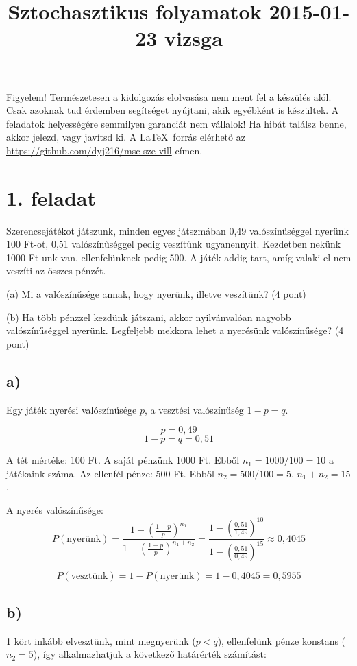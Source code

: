 \documentclass[a4paper,12pt]{article}   		%
\title{Sztochasztikus folyamatok 2015-01-23 vizsga}
\begin{document}
\maketitle

Figyelem! Természetesen a kidolgozás elolvasása nem ment fel a készülés
alól. Csak azoknak tud érdemben segítséget nyújtani, akik egyébként is
készültek. A feladatok helyességére semmilyen garanciát nem vállalok!
Ha hibát találsz benne, akkor jelezd, vagy javítsd ki. A \LaTeX\ forrás
elérhető az \url{https://github.com/dyj216/msc-sze-vill} címen.

\section*{1. feladat}
Szerencsejátékot játszunk, minden egyes játszmában 0,49 valószínűséggel
nyerünk 100 Ft-ot, 0,51 valószínűséggel pedig veszítünk ugyanennyit. 
Kezdetben nekünk 1000 Ft-unk van, ellenfelünknek pedig 500. A játék
addig tart, amíg valaki el nem veszíti az összes pénzét.

(a) Mi a valószínűsége annak, hogy nyerünk, illetve veszítünk? (4 pont)

(b) Ha több pénzzel kezdünk játszani, akkor nyilvánvalóan nagyobb 
valószínűséggel nyerünk. Legfeljebb mekkora lehet a nyerésünk
valószínűsége? (4 pont)
\subsection*{a)}
Egy játék nyerési valószínűsége $p$, a vesztési valószínűség $1-p=q$.

\[p = 0,49\]
\[1-p = q = 0,51\]

A tét mértéke: 100 Ft. A saját pénzünk 1000 Ft. Ebből $n_1 = 1000/100=10$ a 
játékaink száma. Az ellenfél pénze: 500 Ft. Ebből $n_2 = 500/100=5$.
$n_1 + n_2 = 15$.

A nyerés valószínűsége:
\[P(\text{nyerünk}) = \frac{1-\left(\frac{1-p}{p}\right)^{n_1}}
{1-\left(\frac{1-p}{p}\right)^{n_1+n_2}} = 
\frac{1-\left(\frac{0,51}{1,49}\right)^{10}}
{1-\left(\frac{0,51}{0,49}\right)^{15}} \approx 0,4045 \]

\[P(\text{vesztünk}) = 1 - P(\text{nyerünk}) = 1 - 0,4045 = 0,5955\]

\subsection*{b)}
1 kört inkább elvesztünk, mint megnyerünk ($p<q$), ellenfelünk pénze konstans
($n_2 = 5$), így alkalmazhatjuk a következő határérték számítást:
\end{document}
